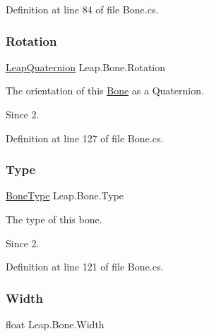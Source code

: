 Definition at line 84 of file Bone.\+cs.

\mbox{\label{class_leap_1_1_bone_a1531c2eecaace7d4532e78f903f3b59a}} 
\subsubsection{\texorpdfstring{Rotation}{Rotation}}
{\footnotesize\ttfamily \mbox{\hyperlink{struct_leap_1_1_leap_quaternion}{Leap\+Quaternion}} Leap.\+Bone.\+Rotation}



The orientation of this \mbox{\hyperlink{class_leap_1_1_bone}{Bone}} as a Quaternion. 

\begin{DoxySince}{Since}
2. 
\end{DoxySince}


Definition at line 127 of file Bone.\+cs.

\mbox{\label{class_leap_1_1_bone_a45b59267b7a357e45ccf28a8c2daf0a6}} 
\subsubsection{\texorpdfstring{Type}{Type}}
{\footnotesize\ttfamily \mbox{\hyperlink{class_leap_1_1_bone_a21054e31cefa7b75f25a026006fdbb1b}{Bone\+Type}} Leap.\+Bone.\+Type}



The type of this bone. 

\begin{DoxySince}{Since}
2. 
\end{DoxySince}


Definition at line 121 of file Bone.\+cs.

\mbox{\label{class_leap_1_1_bone_a1bea3ae48af0c138e0423276191ed8ab}} 
\subsubsection{\texorpdfstring{Width}{Width}}
{\footnotesize\ttfamily float Leap.\+Bone.\+Width}



